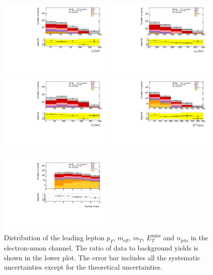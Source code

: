 \begin{figure}[htbp]
\includegraphics[width=0.49\textwidth]{data/plot/Fake_VR/pt1_VR_Fake_emu}
\includegraphics[width=0.49\textwidth]{data/plot/Fake_VR/meff_VR_Fake_emu}\\
\includegraphics[width=0.49\textwidth]{data/plot/Fake_VR/mt1_VR_Fake_emu}
\includegraphics[width=0.49\textwidth]{data/plot/Fake_VR/MET_VR_Fake_emu}\\
\begin{center}
\includegraphics[width=0.49\textwidth]{data/plot/Fake_VR/nJet_VR_Fake_emu}
\end{center}
\caption{Distribution of the  leading lepton $p_T$, $m_{\text{eff}}$, $m_T$, $E_{T}^{\text{miss}}$ and $n_{\text{jets}}$ in the electron-muon channel. The ratio of data to background yields is shown in the lower plot. The error bar includes all the systematic uncertainties except for the theoretical uncertainties.}
\label{fig:VRSS_fake_emu}
\end{figure}
